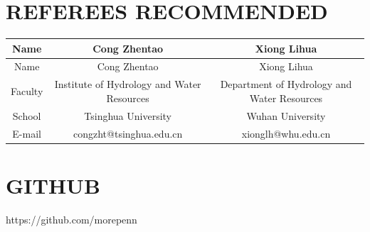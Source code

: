 \documentclass{res}
\begin{document}
\begin{resume}
 

\section{REFEREES RECOMMENDED}      
   
\begin{table}[H]
\begin{center}
\begin{tabular}{ccc} 
\\
\toprule
Name & Cong Zhentao & Xiong Lihua\\
\midrule
Name & Cong Zhentao & Xiong Lihua\\
Faculty & Institute of Hydrology and Water Resources & Department of Hydrology and Water Resources\\
School & Tsinghua University & Wuhan University \\
E-mail & congzht@tsinghua.edu.cn & xionglh@whu.edu.cn\\
\bottomrule
\end{tabular}
\end{center}
\end{table}             
 
\section{GITHUB}          
    https://github.com/morepenn         
 
\end{resume}
\end{document}
